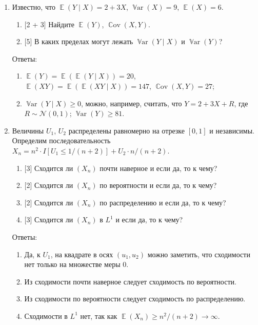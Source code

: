 \documentclass[12pt]{article}
\DeclareMathOperator{\Cov}{\mathbb{C}ov}
\DeclareMathOperator{\Var}{\mathbb{V}ar}
\DeclareMathOperator{\E}{\mathbb{E}}
\newcommand \cN{\mathcal{N}}
\begin{document}
\begin{enumerate}

    \item Известно, что $\E(Y \mid X) = 2 + 3X$, $\Var(X) = 9$, $\E(X) = 6$.
    \begin{enumerate}
        \item {[2 + 3]} Найдите $\E(Y)$, $\Cov(X, Y)$.
        \item {[5]} В каких пределах могут лежать $\Var(Y \mid X)$ и $\Var(Y)$?
    \end{enumerate}

    Ответы:

    \begin{enumerate}
        \item $\E(Y) = \E(\E(Y \mid X)) = 20$, $\E(XY) = \E(\E(XY \mid X)) = 147$, $\Cov(X, Y) = 27$;
        \item $\Var(Y \mid X) \geq 0$, можно, например, считать, что $Y = 2 + 3X + R$, где $R \sim \cN(0, 1)$; $\Var(Y) \geq 81$.
    \end{enumerate}



    \item Величины $U_1$, $U_2$ распределены равномерно на отрезке $[0, 1]$ и независимы.
    Определим последовательность $X_n = n^2 \cdot I[U_1 \leq 1/(n + 2)] + U_2 \cdot n/ (n+2)$.

    \begin{enumerate}
        \item {[3]} Сходится ли $(X_n)$ почти наверное и если да, то к чему?
        \item {[2]} Сходится ли $(X_n)$ по вероятности и если да, то к чему?
        \item {[2]} Сходится ли $(X_n)$ по распределению и если да, то к чему?
        \item {[3]} Сходится ли $(X_n)$ в $L^1$ и если да, то к чему?
    \end{enumerate}

    Ответы: 

    \begin{enumerate}
        \item Да, к $U_1$, на квадрате в осях $(u_1, u_2)$ можно заметить, что сходимости нет только на множестве меры 0. 
        \item Из сходимости почти наверное следует сходимость по вероятности.
        \item Из сходимости по вероятности следует сходимость по распределению.
        \item Сходимости в $L^1$ нет, так как $\E(X_n) \geq n^2/(n+2) \to \infty$.
    \end{enumerate}



\end{enumerate}
\end{document}
